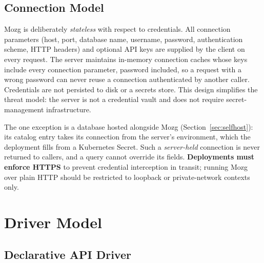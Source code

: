 \documentclass[sigconf,nonacm]{acmart}
\begin{document}
\subsection{Connection Model}

Mozg is deliberately \emph{stateless} with respect to credentials.
All connection parameters (host, port, database name, username,
password, authentication scheme, HTTP headers) and optional API keys
are supplied by the client on every request.  The server maintains
in-memory connection caches whose keys include every connection
parameter, password included, so a request with a wrong password can
never reuse a connection authenticated by another caller.  Credentials
are not persisted to disk or a secrets store.  This design
simplifies the threat model: the server is not a credential vault and
does not require secret-management infrastructure.

The one exception is a database hosted alongside Mozg
(Section~\ref{sec:selfhost}): its catalog entry takes its connection
from the server's environment, which the deployment fills from a
Kubernetes Secret.  Such a \emph{server-held} connection is never
returned to callers, and a query cannot override its fields.
\textbf{Deployments must enforce HTTPS} to prevent credential
interception in transit; running Mozg over plain HTTP should be
restricted to loopback or private-network contexts only.

\section{Driver Model}
\label{sec:drivers}

\subsection{Declarative API Driver}
\end{document}

